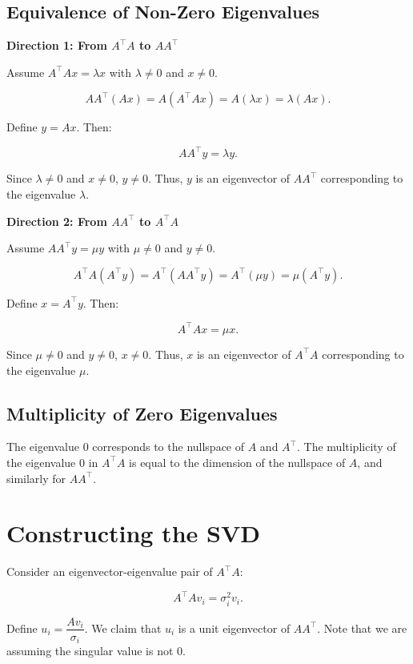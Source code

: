 \documentclass{article}
\begin{document}
\subsection{Equivalence of Non-Zero Eigenvalues}

\textbf{Direction 1: From \( A^\top A \) to \( A A^\top \)}

Assume \( A^\top A x = \lambda x \) with \( \lambda \neq 0 \) and \( x \neq 0 \).

\[
A A^\top (A x) = A (A^\top A x) = A (\lambda x) = \lambda (A x).
\]

Define \( y = A x \). Then:

\[
A A^\top y = \lambda y.
\]

Since \( \lambda \neq 0 \) and \( x \neq 0 \), \( y \neq 0 \). Thus, \( y \) is an eigenvector of \( A A^\top \) corresponding to the eigenvalue \( \lambda \).

\textbf{Direction 2: From \( A A^\top \) to \( A^\top A \)}

Assume \( A A^\top y = \mu y \) with \( \mu \neq 0 \) and \( y \neq 0 \).

\[
A^\top A (A^\top y) = A^\top (A A^\top y) = A^\top (\mu y) = \mu (A^\top y).
\]

Define \( x = A^\top y \). Then:

\[
A^\top A x = \mu x.
\]

Since \( \mu \neq 0 \) and \( y \neq 0 \), \( x \neq 0 \). Thus, \( x \) is an eigenvector of \( A^\top A \) corresponding to the eigenvalue \( \mu \).

\subsection{Multiplicity of Zero Eigenvalues}

The eigenvalue \( 0 \) corresponds to the nullspace of \( A \) and \( A^\top \). The multiplicity of the eigenvalue \( 0 \) in \( A^\top A \) is equal to the dimension of the nullspace of \( A \), and similarly for \( A A^\top \).

\section{Constructing the SVD}

Consider an eigenvector-eigenvalue pair of \( A^\top A \):

\[
A^\top A v_i = \sigma_i^2 v_i.
\]

Define \( u_i = \dfrac{A v_i}{\sigma_i} \). We claim that \( u_i \) is a unit eigenvector of \( A A^\top \). Note that we are assuming the singular value is not 0.
\end{document}
